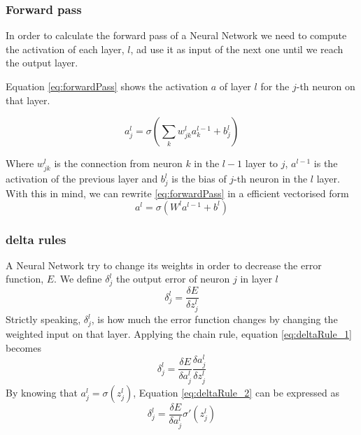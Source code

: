 \documentclass[11pt]{article}
\begin{document}
\subsubsection{Forward pass}
In order to calculate the forward pass of a Neural Network we need to compute the activation of each layer, $l$, ad use it as input of the next one until we reach the output layer. 

Equation \ref{eq:forwardPass} shows the activation $a$ of layer $l$ for the $j$-th neuron on that layer.

\begin{equation}
\label{eq:forwardPass}
a^l_j = \sigma(\sum_k w^l_{jk}a^{l-1}_k + b^l_j)
\end{equation}

Where $w^l_{jk}$ is the connection from neuron $k$ in the $l-1$ layer to $j$, $a^{l-1}$ is the activation of the previous layer and $b^l_j$ is the bias of $j$-th neuron in the $l$ layer. With this in mind, we can rewrite \ref{eq:forwardPass} in a efficient vectorised form
\begin{equation}
\label{eq:forwardPassVectorized}
a^l = \sigma(W^la^{l-1} + b^l)
\end{equation}

\subsubsection{delta rules}
A Neural Network try to change its weights in order to decrease the error function, $E$. We define $\delta^l_j$ the output error of neuron $j$ in layer $l$
\begin{equation}
	\label{eq:deltaRule_1}
	\delta^l_j = \frac{\delta E}{\delta z^l_j}
\end{equation}
Strictly speaking, $\delta^l_j$, is how much the error function changes by changing the weighted input on that layer. Applying the chain rule, equation \ref{eq:deltaRule_1} becomes
\begin{equation}
\label{eq:deltaRule_2}
\delta^l_j = \frac{\delta E}{\delta a^l_j} \frac{\delta a^l_j}{\delta z^l_j}
\end{equation}
By knowing that $a^l_j = \sigma(z^l_j)$, Equation \ref{eq:deltaRule_2} can be expressed as
\begin{equation}
\label{eq:deltaRule}	
\delta^l_j = \frac{\delta E}{\delta a^l_j} \sigma'(z^l_j)
\end{equation}  

\end{document}
